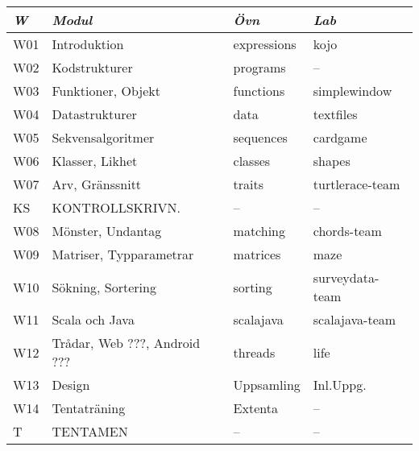 \begin{tabular}{l|l|l|l}
\textit{W} & \textit{Modul} & \textit{Övn} & \textit{Lab} \\ \hline \hline
W01 & Introduktion                 & expressions & kojo            \\
W02 & Kodstrukturer                & programs    & --              \\
W03 & Funktioner, Objekt           & functions   & simplewindow    \\
W04 & Datastrukturer               & data        & textfiles       \\
W05 & Sekvensalgoritmer            & sequences   & cardgame        \\
W06 & Klasser, Likhet              & classes     & shapes          \\
W07 & Arv, Gränssnitt              & traits      & turtlerace-team \\
KS  & KONTROLLSKRIVN.              & --          & --              \\
W08 & Mönster, Undantag            & matching    & chords-team     \\
W09 & Matriser, Typparametrar      & matrices    & maze            \\
W10 & Sökning, Sortering           & sorting     & surveydata-team \\
W11 & Scala och Java               & scalajava   & scalajava-team  \\
W12 & Trådar, Web ???, Android ??? & threads     & life            \\
W13 & Design                       & Uppsamling  & Inl.Uppg.       \\
W14 & Tentaträning                 & Extenta     & --              \\
T   & TENTAMEN                     & --          & --              \\
\end{tabular}
